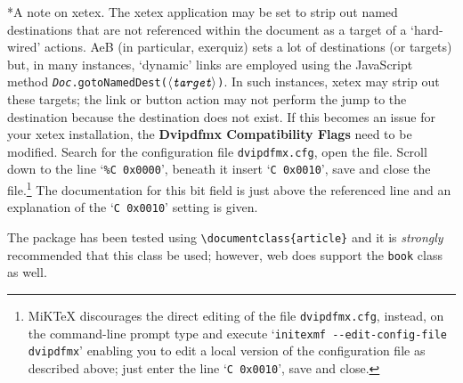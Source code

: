 \documentclass{article}
\makeatletter
\renewcommand{\paragraph}
    {\@startsection{paragraph}{4}{0pt}{6pt}{-3pt}
    {\normalfont\normalsize\bfseries}}
\def\Web{\textsf{web}}
\def\anglemeta#1{$\langle\textit{\texttt{#1}}\rangle$}
\let\pkg\textsf
\let\app\textsf
\def\FitItIn{\eq@fititin}
\def\endredpoint{\FitItIn{{\large\ifusebw\color{black}\else\color{red}\fi$\blacktriangleleft$}}}
\makeatother
\begin{document}
{\paragraph*{A note on \app{xetex}.}
The \app{xetex} application may be set to strip out named destinations that
are not referenced within the document as a target of a `hard-wired' actions.
\app{AeB} (in particular, \pkg{exerquiz}) sets a lot of destinations (or
targets) but, in many instances, `dynamic' links are employed using the
JavaScript method \texttt{\textsl{Doc}.gotoNamedDest(\anglemeta{target})}. In
such instances, \app{xetex} may strip out these targets; the link or button
action may not perform the jump to the destination because the destination
does not exist. If this becomes an issue for your \app{xetex} installation,
the \textbf{\app{Dvipdfmx} Compatibility Flags} need to be modified. Search
for the configuration file \texttt{dvipdfmx.cfg}, open the file. Scroll down
to the line `\texttt{\%C  0x0000}', beneath it insert `\texttt{C  0x0010}',
save and close the file.\footnote{MiK\TeX{} discourages the direct editing of
the file \texttt{dvipdfmx.cfg}, instead, on the command-line prompt type and
execute `\texttt{initexmf -{}-edit-config-file dvipdfmx}' enabling you to
edit a local version of the configuration file as described above;
just enter the line `\texttt{C  0x0010}', save and close.} The documentation
for this bit field is just above the referenced line and an explanation of
the `\texttt{C 0x0010}' setting is given.

\redpoint The package has been tested using
\verb+\documentclass{article}+ and it is \emph{strongly}
recommended that this class be used; however, {\Web} does support the
\texttt{book} class as well.\endredpoint

}
\end{document}
